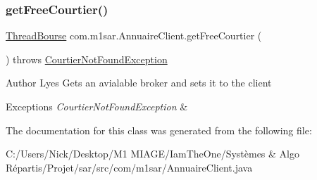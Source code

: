 \subsubsection{\texorpdfstring{get\+Free\+Courtier()}{getFreeCourtier()}}
{\footnotesize\ttfamily \hyperlink{classcom_1_1m1sar_1_1_thread_bourse}{Thread\+Bourse} com.\+m1sar.\+Annuaire\+Client.\+get\+Free\+Courtier (\begin{DoxyParamCaption}{ }\end{DoxyParamCaption}) throws \hyperlink{classcom_1_1exceptions_1_1_courtier_not_found_exception}{Courtier\+Not\+Found\+Exception}}

\begin{DoxyAuthor}{Author}
Lyes Gets an avialable broker and sets it to the client 
\end{DoxyAuthor}

\begin{DoxyExceptions}{Exceptions}
{\em Courtier\+Not\+Found\+Exception} & \\
\hline
\end{DoxyExceptions}


The documentation for this class was generated from the following file\+:\begin{DoxyCompactItemize}
\item 
C\+:/\+Users/\+Nick/\+Desktop/\+M1 M\+I\+A\+G\+E/\+Iam\+The\+One/\+Systèmes \& Algo Répartis/\+Projet/sar/src/com/m1sar/Annuaire\+Client.\+java\end{DoxyCompactItemize}
